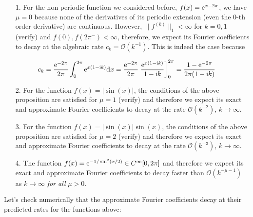 \documentclass[12pt,a4paper]{article}
\begin{document}
\begin{itemize}
\item[1. ] For the non-periodic function we considered before, $f(x) = {\rm e}^{x-2\pi}$, we have $\mu = 0$ because none of the derivatives of its periodic extension (even the $0$-th order derivative) are continuous.  However, $\| f^{(k)} \|_{1} < \infty$ for $k = 0, 1$ (verify) and $f(0), f(2\pi^{-}) < \infty$, therefore, we expect its Fourier coefficients to decay at the algebraic rate $c_k = \mathcal{O}(k^{-1})$. This is indeed the case because

\end{itemize}
\[
c_{k} = \frac{{\rm e}^{-2\pi}}{2\pi}\int_{0}^{2\pi} {\rm e}^{x(1-{\rm i}k)}{\rm d}x = \frac{{\rm e}^{-2\pi}}{2\pi } \left. \frac{{\rm e}^{x(1-{\rm i}k)}}{1-{\rm i}k}   \right]_{0}^{2\pi} = \frac{1 - {\rm e}^{-2\pi}}{2\pi(1-{\rm i}k)}
\]
\begin{itemize}
\item[2. ] For the function $f(x) = \vert \sin(x) \vert$, the conditions of the above proposition are satisfied for $\mu = 1$ (verify) and therefore we expect its exact and approximate Fourier coefficients to decay at the rate $\mathcal{O}(k^{-2})$, $k \to \infty$.


\item[3. ] For the function $f(x) = \vert \sin(x) \vert \sin(x)$, the conditions of the above proposition are satisfied for $\mu = 2$ (verify) and therefore we expect its exact and approximate Fourier coefficients to decay at the rate $\mathcal{O}(k^{-3})$, $k \to \infty$.


\item[4. ] The function $f(x) = {\rm e}^{-1/\sin^2(x/2)} \in C^{\infty}[0, 2\pi]$  and therefore we expect its exact and approximate Fourier coefficients to decay faster than $\mathcal{O}(k^{-\mu-1})$ as $k \to \infty$ \emph{for all} $\mu > 0$.

\end{itemize}
Let's check numerically that the approximate Fourier coefficients decay at their predicted rates for the functions above:
\end{document}

